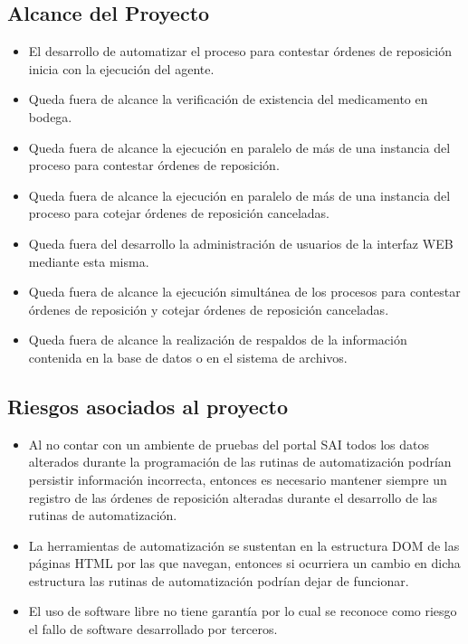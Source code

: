 \subsection{Alcance del Proyecto}
\begin{itemize}
\item El desarrollo de automatizar el proceso para contestar órdenes de reposición inicia con la ejecución del agente.
\item Queda fuera de alcance la verificación de existencia del medicamento en bodega.
\item Queda fuera de alcance la ejecución en paralelo de más de una instancia del proceso para contestar órdenes de reposición.
\item Queda fuera de alcance la ejecución en paralelo de más de una instancia del proceso para cotejar órdenes de reposición canceladas.
\item Queda fuera del desarrollo la administración de usuarios de la interfaz WEB mediante esta misma.
\item Queda fuera de alcance la ejecución simultánea de los procesos para contestar órdenes de reposición y cotejar órdenes de reposición canceladas.
\item Queda fuera de alcance la realización de respaldos de la información contenida en la base de datos o en el sistema de archivos.
\end{itemize}


\subsection{Riesgos asociados al proyecto}
\begin{itemize}
\item Al no contar con un ambiente de pruebas del portal SAI todos los datos alterados durante la programación de las rutinas de automatización podrían persistir información incorrecta, entonces es necesario mantener siempre un registro de las órdenes de reposición alteradas durante el desarrollo de las rutinas de automatización.
\item La herramientas de automatización se sustentan en la estructura DOM de las páginas HTML por las que navegan, entonces si ocurriera un cambio en dicha estructura las rutinas de automatización podrían dejar de funcionar.
\item El uso de software libre no tiene garantía por lo cual se reconoce como riesgo el fallo de software desarrollado por terceros.
\end{itemize}


